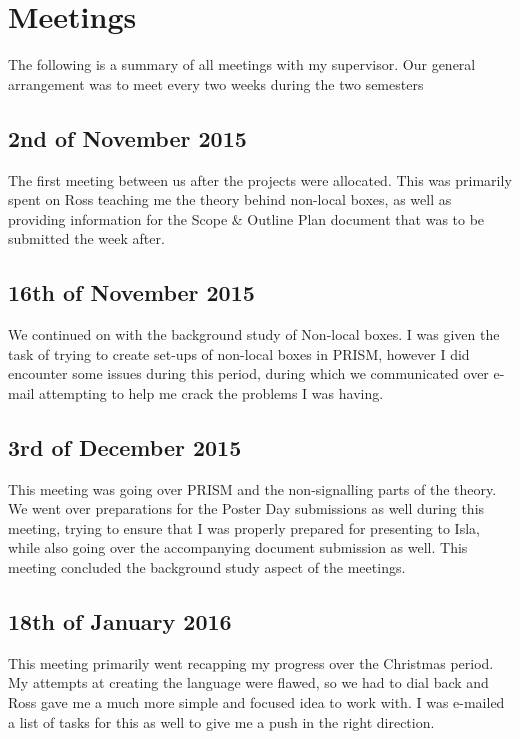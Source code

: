 \documentclass[report.tex]{subfiles}
\begin{document}
\section{Meetings} %
\label{sec:meetings}
The following is a summary of all meetings with my supervisor. Our general
arrangement was to meet every two weeks during the two semesters

\subsection{2nd of November 2015} %
\label{sub:2nd_of_february_2015}
The first meeting between us after the projects were allocated. This was
primarily spent on Ross teaching me the theory behind non-local boxes, as well
as providing information for the Scope \& Outline Plan document that was to be
submitted the week after.

\subsection{16th of November 2015} %
\label{sub:16th_of_november_2015}
We continued on with the background study of Non-local boxes. I was given the
task of trying to create set-ups of non-local boxes in PRISM, however I did
encounter some issues during this period, during which we communicated over
e-mail attempting to help me crack the problems I was having.

\subsection{3rd of December 2015} %
\label{sub:3rd_of_december_2015}
This meeting was going over PRISM and the non-signalling parts of the theory. 
We went over preparations for the Poster Day submissions as well during this
meeting, trying to ensure that I was properly prepared for presenting to Isla,
while also going over the accompanying document submission as well. This
meeting concluded the background study aspect of the meetings.

\subsection{18th of January 2016} %
\label{sub:18th_of_january_2016}
This meeting primarily went recapping my progress over the Christmas period. My
attempts at creating the language were flawed, so we had to dial back and Ross
gave me a much more simple and focused idea to work with. I was e-mailed a list
of tasks for this as well to give me a push in the right direction.
\end{document}
